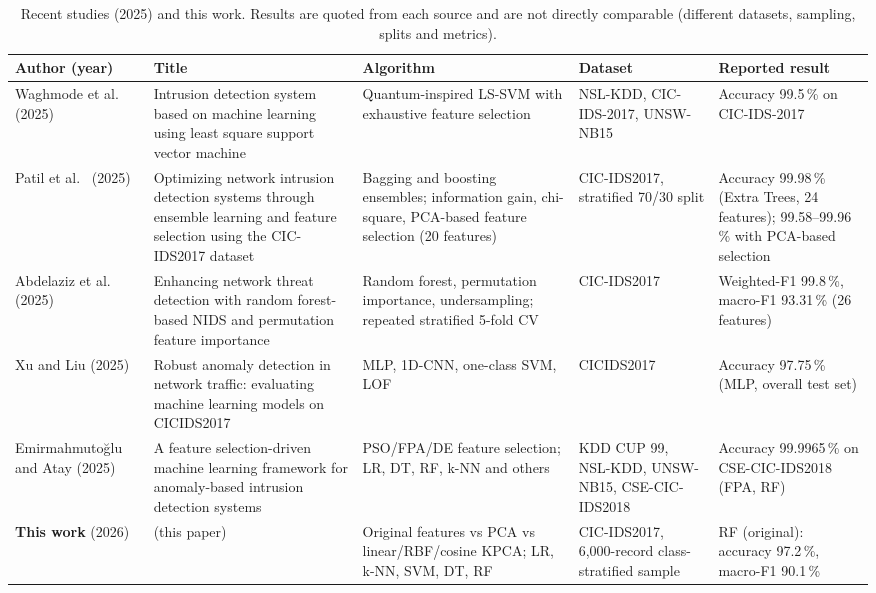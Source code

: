 \documentclass[runningheads]{llncs}
\begin{document}
\begin{table}[htbp]
\caption{Recent studies (2025) and this work. Results are quoted from each source and are not directly comparable (different datasets, sampling, splits and metrics).}\label{tab:lit}
\centering\scriptsize
\renewcommand{\arraystretch}{1.15}
\begin{tabular}{@{}>{\raggedright\arraybackslash}p{2.3cm}>{\raggedright\arraybackslash}p{3.3cm}>{\raggedright\arraybackslash}p{2.4cm}>{\raggedright\arraybackslash}p{1.7cm}>{\raggedright\arraybackslash}p{1.7cm}@{}}
\toprule
Author (year) & Title & Algorithm & Dataset & Reported result \\
\midrule
Waghmode et al.\ \cite{waghmode2025} (2025) & Intrusion detection system based on machine learning using least square support vector machine & Quantum-inspired LS-SVM with exhaustive feature selection & NSL-KDD, CIC-IDS-2017, UNSW-NB15 & Accuracy 99.5\,\% on CIC-IDS-2017 \\
Patil et al.\ \cite{patil2025} (2025) & Optimizing network intrusion detection systems through ensemble learning and feature selection using the CIC-IDS2017 dataset & Bagging and boosting ensembles; information gain, chi-square, PCA-based feature selection (20 features) & CIC-IDS2017, stratified 70/30 split & Accuracy 99.98\,\% (Extra Trees, 24 features); 99.58--99.96\,\% with PCA-based selection \\
Abdelaziz et al.\ \cite{abdelaziz2025} (2025) & Enhancing network threat detection with random forest-based NIDS and permutation feature importance & Random forest, permutation importance, undersampling; repeated stratified 5-fold CV & CIC-IDS2017 & Weighted-F1 99.8\,\%, macro-F1 93.31\,\% (26 features) \\
Xu and Liu \cite{xu2025} (2025) & Robust anomaly detection in network traffic: evaluating machine learning models on CICIDS2017 & MLP, 1D-CNN, one-class SVM, LOF & CICIDS2017 & Accuracy 97.75\,\% (MLP, overall test set) \\
Emirmahmuto\u{g}lu and Atay \cite{emirmahmutoglu2025} (2025) & A feature selection-driven machine learning framework for anomaly-based intrusion detection systems & PSO/FPA/DE feature selection; LR, DT, RF, k-NN and others & KDD CUP 99, NSL-KDD, UNSW-NB15, CSE-CIC-IDS2018 & Accuracy 99.9965\,\% on CSE-CIC-IDS2018 (FPA, RF) \\
\midrule
\textbf{This work} (2026) & (this paper) & Original features vs PCA vs linear/RBF/cosine KPCA; LR, k-NN, SVM, DT, RF & CIC-IDS2017, 6,000-record class-stratified sample & RF (original): accuracy 97.2\,\%, macro-F1 90.1\,\% \\
\bottomrule
\end{tabular}
\end{table}
\end{document}
